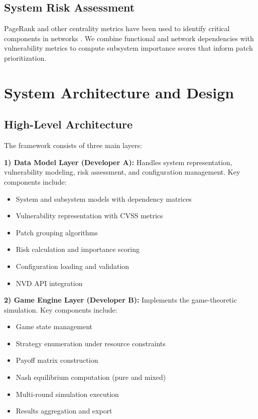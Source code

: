 \documentclass[conference]{IEEEtran}
\begin{document}
\subsection{System Risk Assessment}
PageRank and other centrality metrics have been used to identify critical components in networks \cite{pagerank1999}. We combine functional and network dependencies with vulnerability metrics to compute subsystem importance scores that inform patch prioritization.

\section{System Architecture and Design}

\subsection{High-Level Architecture}
The framework consists of three main layers:

\textbf{1) Data Model Layer (Developer A):} Handles system representation, vulnerability modeling, risk assessment, and configuration management. Key components include:
\begin{itemize}
    \item System and subsystem models with dependency matrices
    \item Vulnerability representation with CVSS metrics
    \item Patch grouping algorithms
    \item Risk calculation and importance scoring
    \item Configuration loading and validation
    \item NVD API integration
\end{itemize}

\textbf{2) Game Engine Layer (Developer B):} Implements the game-theoretic simulation. Key components include:
\begin{itemize}
    \item Game state management
    \item Strategy enumeration under resource constraints
    \item Payoff matrix construction
    \item Nash equilibrium computation (pure and mixed)
    \item Multi-round simulation execution
    \item Results aggregation and export
\end{itemize}
\end{document}
